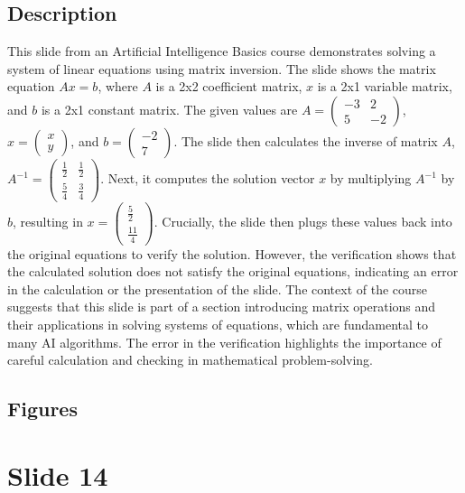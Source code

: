 \documentclass{article}%
\begin{document}
\subsection{Description}%
This slide from an Artificial Intelligence Basics course demonstrates solving a system of linear equations using matrix inversion.  The slide shows the matrix equation $Ax = b$, where $A$ is a 2x2 coefficient matrix, $x$ is a 2x1 variable matrix, and $b$ is a 2x1 constant matrix.  The given values are $A = \begin{pmatrix} -3 & 2 \\ 5 & -2 \end{pmatrix}$, $x = \begin{pmatrix} x \\ y \end{pmatrix}$, and $b = \begin{pmatrix} -2 \\ 7 \end{pmatrix}$.  The slide then calculates the inverse of matrix $A$, $A^{-1} = \begin{pmatrix} \frac{1}{2} & \frac{1}{2} \\ \frac{5}{4} & \frac{3}{4} \end{pmatrix}$.  Next, it computes the solution vector $x$ by multiplying $A^{-1}$ by $b$, resulting in $x = \begin{pmatrix} \frac{5}{2} \\ \frac{11}{4} \end{pmatrix}$.  Crucially, the slide then plugs these values back into the original equations to verify the solution.  However, the verification shows that the calculated solution does not satisfy the original equations, indicating an error in the calculation or the presentation of the slide.  The context of the course suggests that this slide is part of a section introducing matrix operations and their applications in solving systems of equations, which are fundamental to many AI algorithms.  The error in the verification highlights the importance of careful calculation and checking in mathematical problem-solving.%
\subsection{Figures}%
\begin{figure}[H]%
\centering%
\end{figure}

%
\newpage%
\section{Slide 14}%
\label{sec:Slide14}%
\end{document}
